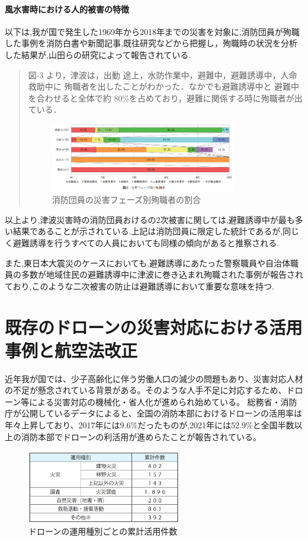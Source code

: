 \paragraph{風水害時における人的被害の特徴}
以下は,我が国で発生した1969年から2018年までの災害を対象に,消防団員が殉職した事例を消防白書や新聞記事,既往研究などから把握し，殉職時の状況を分析した結果が,山田らの研究\cite{yamada2020}によって報告されている.
\begin{quote}
  図-3 より，津波は，出動 途上，水防作業中，避難中，避難誘導中，人命救助中に 殉職者を出したことがわかった．なかでも避難誘導中と 避難中を合わせると全体で約 80\%を占めており，避難に関係する時に殉職者が出ている．
  \begin{figure}[H] 
    \centering 
    \includegraphics[width=0.8\textwidth]{Figures/fig-01.png}
    \caption{消防団員の災害フェーズ別殉職者の割合} 
    \label{fig:01} 
  \end{figure}
\end{quote}
以上より,津波災害時の消防団員おけるの2次被害に関しては,避難誘導中が最も多い結果であることが示されている.上記は消防団員に限定した統計であるが,同じく避難誘導を行うすべての人員においても同様の傾向があると推察される.\par
また,東日本大震災のケースにおいても,避難誘導にあたった警察職員や自治体職員の多数が地域住民の避難誘導中に津波に巻き込まれ殉職された事例\cite{touhoku-01}が報告されており,このような二次被害の防止は避難誘導において重要な意味を持つ.

\section{既存のドローンの災害対応における活用事例と航空法改正}
近年我が国では、少子高齢化に伴う労働人口の減少の問題もあり、災害対応人材の不足が懸念されている背景がある。そのような人手不足に対応するため、ドローン等による災害対応の機械化・省人化が進められ始めている。
総務省・消防庁が公開しているデータ\cite{soumusho-01}によると、全国の消防本部におけるドローンの活用率は年々上昇しており、2017年には9.6\%だったものが,2021年には52.9\%と全国半数以上の消防本部でドローンの利活用が進めらたことが報告されている。
\begin{figure}[H] 
  \centering 
  \includegraphics[width=0.6\textwidth]{Figures/2024-11-28 215911.png}
  \caption{ドローンの運用種別ごとの累計活用件数} 
  \label{fig:01} 
\end{figure}

